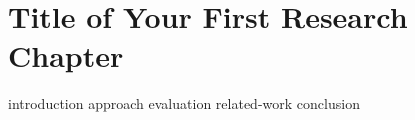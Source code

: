 
\newcommand{\toolone}{\textsc{ToolOne}\xspace}

\chapter{Title of Your First Research Chapter}
\label{chap:example-one}


{introduction}
{approach}
{evaluation}
{related-work}
{conclusion}
